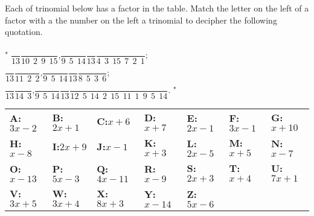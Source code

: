 \newpage

\begin{exercise}
	Each of trinomial below has a factor in the table. Match the letter on the left of a factor with a the number on the left a trinomial to decipher the following quotation.
\begin{center}
	\parbox{0.8\textwidth}{
	" $\dfrac{\phantom{A}}{13}$\quad $\dfrac{\phantom{A}}{10~~2~~9~~15}$,\quad $\dfrac{\phantom{A}}{9~~5~~14}$\quad $\dfrac{\phantom{A}}{13}$\quad $\dfrac{\phantom{A}}{4~~3~~15~~7~~2~~1}$;\\[1em]
	\phantom{"} $\dfrac{\phantom{A}}{13}$\quad $\dfrac{\phantom{A}}{11~~2~~2}$,\quad $\dfrac{\phantom{A}}{9~~5~~14}$\quad $\dfrac{\phantom{A}}{13}$\quad $\dfrac{\phantom{A}}{8~~5~~3~~6}$;\\[1em]
	\phantom{"} $\dfrac{\phantom{A}}{13}$\quad $\dfrac{\phantom{A}}{14~~3}$,\quad $\dfrac{\phantom{A}}{9~~5~~14}$\quad $\dfrac{\phantom{A}}{13}$\quad $\dfrac{\phantom{A}}{12~~5~~14~~2~~15~~11~~1~~9~~5~~14}$. "
	}
\end{center}

\begin{longtable}[]{@{}lllllll@{}}
	\toprule
	\textbf{A:}\quad\(3x-2\) & 
	\textbf{B:}\quad\(2x+1\) & 
	\textbf{C:}\quad\(x+6\) &
	\textbf{D:}\quad\(x+7\) &
	\textbf{E:}\quad\(2x-1\) & 
	\textbf{F:}\quad\(3x-1\) & 
	\textbf{G:}\quad\(x+10\) 
\tabularnewline
	\textbf{H:}\quad\(x-8\) &
	\textbf{I:}\quad\(2x+9\) & 
	\textbf{J:}\quad\(x-1\) & 
	\textbf{K:}\quad\(x+3\) &
	\textbf{L:}\quad\(2x-5\) &
	\textbf{M:}\quad\(x+5\) & 
	\textbf{N:}\quad\(x-7\) \tabularnewline
	\textbf{O:}\quad\(x-13\) &
	\textbf{P:}\quad\(5x-3\) &
	\textbf{Q:}\quad\(4x-11\) & 
	\textbf{R:}\quad\(x-9\) & 
	\textbf{S:}\quad\(2x+3\) &
	\textbf{T:}\quad\(x+4\) &
	\textbf{U:}\quad\(7x+1\) \tabularnewline
	\textbf{V:}\quad\(3x+5\) & 
	\textbf{W:}\quad\(3x+4\) &
	\textbf{X:}\quad\(8x+3\) &
	\textbf{Y:}\quad\(x-14\) & 
	\textbf{Z:}\quad\(5x-6\) & 
	&\tabularnewline
	\bottomrule
	\end{longtable}


\end{exercise}
